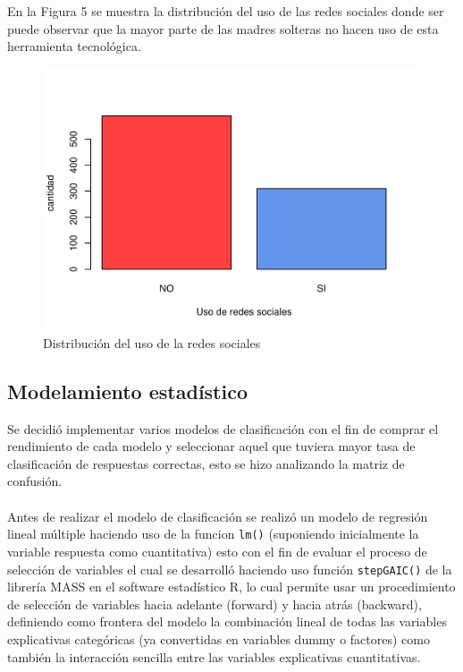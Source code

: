 \documentclass[11pt,twoside]{article}
\begin{document}
\vspace{180px}
\noindent
En la Figura 5 se muestra la distribución del uso de las redes sociales donde ser puede observar que la mayor parte de las madres solteras no hacen uso de esta herramienta tecnológica.
\begin{figure}[H]
	\centering
	\includegraphics{usoderedes.pdf}
	\caption{Distribución del uso de la redes sociales}
\end{figure}



\subsection{Modelamiento estadístico}
\noindent
Se decidió implementar varios modelos de clasificación con el fin de comprar el rendimiento de cada modelo y seleccionar aquel que tuviera mayor tasa de clasificación de respuestas correctas, esto se hizo analizando la matriz de confusión.  
\\
\\
Antes de realizar el modelo de clasificación se realizó un modelo de regresión lineal múltiple haciendo uso de la funcion \texttt{lm()} (suponiendo inicialmente la variable respuesta como cuantitativa) esto con el fin de evaluar el proceso de selección de variables el cual se desarrolló haciendo uso función \texttt{stepGAIC()} de la librería MASS en el software estadístico R, lo cual permite usar un procedimiento de selección de variables hacia adelante (forward) y hacia atrás (backward), definiendo como frontera del modelo la combinación lineal de todas las variables explicativas categóricas (ya convertidas en variables dummy o factores) como también la interacción sencilla entre las variables explicativas cuantitativas.
\end{document}
